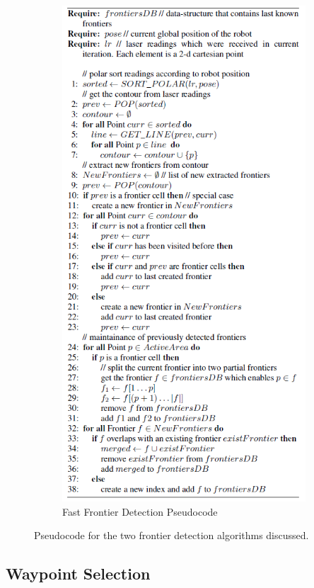 \documentclass[a4paper,12pt]{article}
\begin{document}
\begin{figure}[H]
\begin{subfigure}{.5\textwidth}
						\includegraphics[width=.9\linewidth]{images/ffdPseudocode.png}
						\caption{Fast Frontier Detection Pseudocode}
						\label{ffdPseudocode}
					\end{subfigure}
					\caption{Pseudocode for the two frontier detection algorithms discussed.}
					\label{frontierSearchPseudocode}
				\end{figure}

			\subsection{Waypoint Selection}
\end{document}
